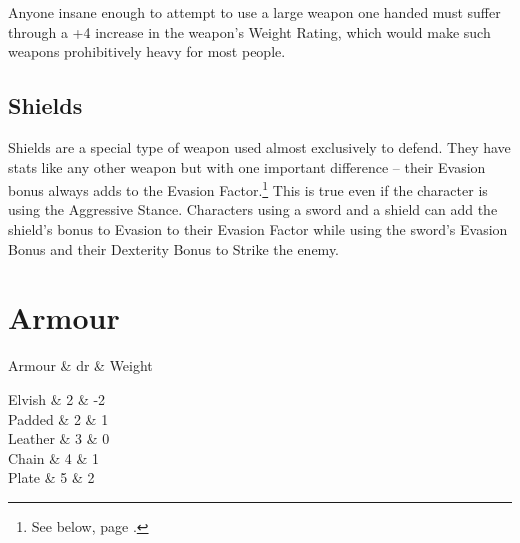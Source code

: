 \documentclass[titlepage,a4paper,openany]{book}
\begin{document}
\begin{multicols}{2}
Anyone insane enough to attempt to use a large weapon one handed must suffer through a +4 increase in the weapon's Weight Rating, which would make such weapons prohibitively heavy for most people.

\subsection{Shields}

Shields are a special type of weapon used almost exclusively to defend.
They have stats like any other weapon but with one important difference -- their Evasion bonus always adds to the Evasion Factor.\footnote{See below, page \pageref{stances}.}
This is true even if the character is using the Aggressive Stance.
Characters using a sword and a shield can add the shield's bonus to Evasion to their Evasion Factor while using the sword's Evasion Bonus and their Dexterity Bonus to Strike the enemy.

\end{multicols}

\newcommand{\armourchart}{

	\begin{tcolorbox}[arc=1mm,tabularx={lcc}]

	Armour & \gls{dr} & Weight \\\hline

	Elvish & 2 & -2 \\

	Padded & 2 & 1 \\

	Leather & 3 & 0 \\

	Chain & 4 & 1 \\

	Plate & 5 & 2 \\

	\end{tcolorbox}
}

\section{Armour}

\begin{table}

\armourchart

\end{table}
\end{document}
